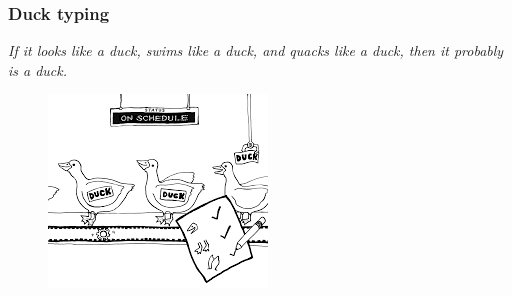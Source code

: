 \documentclass[xcolor ={table,usenames,dvipsnames}]{beamer}
\theoremstyle{definition}
\begin{document}
	
%	
	
	
	

	\begin{frame}
		\frametitle{Duck typing}
		\textit{ If it looks like a duck, swims like a duck, and quacks like a duck, then it probably is a duck.}\\
		\begin{figure}[h!]
			\centering
			\includegraphics[scale=0.75]{img/duck.png}
			\label{Interfacce di un CS}
		\end{figure}
	\end{frame}
\end{document}

